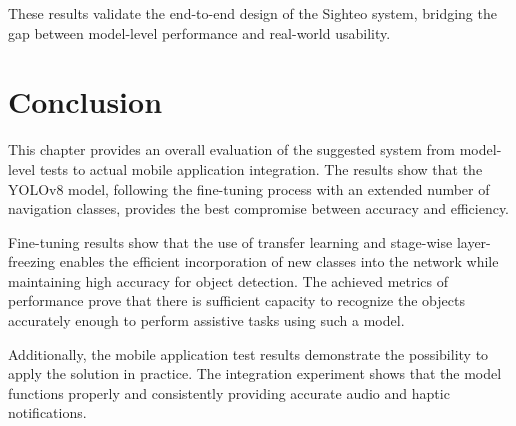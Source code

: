 \documentclass{FastFyp}
\begin{document}
These results validate the end-to-end design of the Sighteo system, bridging the gap between model-level performance and real-world usability.


\section{Conclusion}
This chapter provides an overall evaluation of the suggested system from model-level tests to actual mobile application integration. The results show that the YOLOv8 model, following the fine-tuning process with an extended number of navigation classes, provides the best compromise between accuracy and efficiency.

Fine-tuning results show that the use of transfer learning and stage-wise layer-freezing enables the efficient incorporation of new classes into the network while maintaining high accuracy for object detection. The achieved metrics of performance prove that there is sufficient capacity to recognize the objects accurately enough to perform assistive tasks using such a model.

Additionally, the mobile application test results demonstrate the possibility to apply the solution in practice. The integration experiment shows that the model functions properly and consistently providing accurate audio and haptic notifications.
\end{document}
